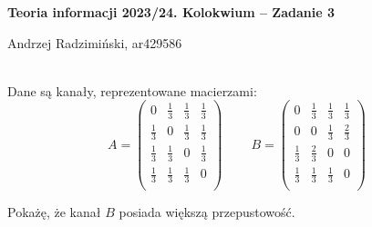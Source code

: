


\setlength{\parindent}{0pt}
\noindent

{\bf Teoria informacji 2023/24. Kolokwium -- Zadanie 3}

Andrzej Radzimiński, ar429586
\\

\ \\

\newcommand{\ot}{\frac{1}{3}}
\newcommand{\twt}{\frac{2}{3}}

\renewcommand*{\arraystretch}{1.5}

Dane są kanały, reprezentowane macierzami:
$$
A =
\begin{pmatrix}
	0   & \ot & \ot & \ot \\
	\ot & 0   & \ot & \ot \\
	\ot & \ot & 0   & \ot \\
	\ot & \ot & \ot & 0   \\
\end{pmatrix}
\ \ \ \ \ \ \ \ \ \  
B = 
\begin{pmatrix}
	0   & \ot & \ot & \ot \\
	0   & 0   & \ot & \twt \\
	\ot & \twt& 0   & 0  \\
	\ot & \ot & \ot & 0   \\
\end{pmatrix}
$$

Pokażę, że kanał $B$ posiada większą przepustowość.


